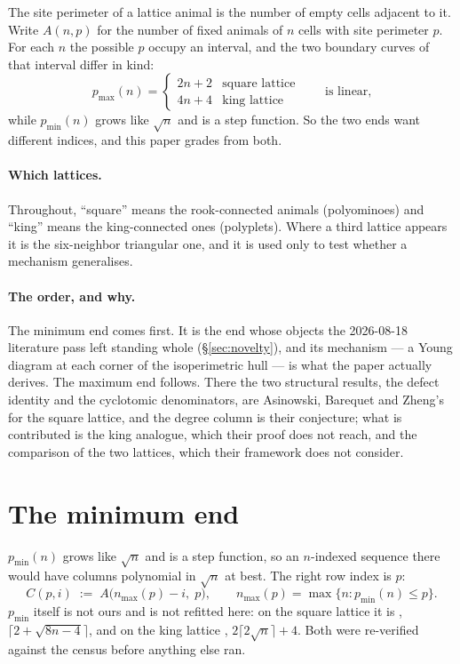 \documentclass[11pt]{article}
\newcommand{\pmaxx}{p_{\max}}
\newcommand{\pminn}{p_{\min}}
\begin{document}
The site perimeter of a lattice animal is the number of empty cells adjacent to
it. Write $A(n,p)$ for the number of fixed animals of $n$ cells with site
perimeter $p$. For each $n$ the possible $p$ occupy an interval, and the two
boundary curves of that interval differ in kind:
\[
  \pmaxx(n) = \begin{cases} 2n+2 & \text{square lattice} \\ 4n+4 & \text{king lattice}\end{cases}
  \qquad\text{is linear,}
\]
while $\pminn(n)$ grows like $\sqrt n$ and is a step function. So the two ends
want different indices, and this paper grades from both.

\paragraph{Which lattices.} Throughout, ``square'' means the rook-connected
animals (polyominoes) and ``king'' means the king-connected ones (polyplets).
Where a third lattice appears it is the six-neighbor triangular one, and it is
used only to test whether a mechanism generalises.

\paragraph{The order, and why.} The minimum end comes first. It is the end
whose objects the 2026-08-18 literature pass left standing whole
(\S\ref{sec:novelty}), and its mechanism --- a Young diagram at each corner of
the isoperimetric hull --- is what the paper actually derives. The maximum end
follows. There the two structural results, the defect identity and the
cyclotomic denominators, are Asinowski, Barequet and Zheng's for the square
lattice, and the degree column is their conjecture; what is contributed is the
king analogue, which their proof does not reach, and the comparison of the two
lattices, which their framework does not consider.

\section{The minimum end}
\label{sec:min}

$\pminn(n)$ grows like $\sqrt n$ and is a step function, so an $n$-indexed sequence
there would have columns polynomial in $\sqrt n$ at best. The right row index is
$p$:
\[
  C(p,i) \;:=\; A\bigl(n_{\max}(p) - i,\; p\bigr),
  \qquad n_{\max}(p) = \max\{n : \pminn(n) \le p\}.
\]
$\pminn$ itself is not ours and is not refitted here: on the square lattice it is
, $\lceil 2 + \sqrt{8n-4}\rceil$, and on the king lattice
, $2\lceil 2\sqrt n\rceil + 4$. Both were re-verified against the
census before anything else ran.
\end{document}
